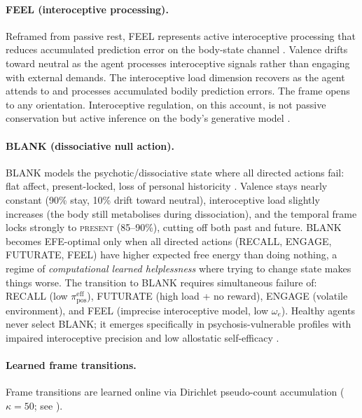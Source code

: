 \documentclass[11pt,a4paper]{article}
\begin{document}
\paragraph{FEEL (interoceptive processing).}
Reframed from passive rest, FEEL represents active interoceptive processing that reduces accumulated prediction error on the body-state channel \citep{sandvedsmith2021towards, stephan2016allostatic}. Valence drifts toward neutral as the agent processes interoceptive signals rather than engaging with external demands. The interoceptive load dimension recovers as the agent attends to and processes accumulated bodily prediction errors. The frame opens to any orientation. Interoceptive regulation, on this account, is not passive conservation but active inference on the body's generative model \citep{seth2016interoceptive, pezzulo2015active}.

\paragraph{BLANK (dissociative null action).}
BLANK models the psychotic/dissociative state where all directed actions fail: flat affect, present-locked, loss of personal historicity \citep{sterzer2018predictive}. Valence stays nearly constant (90\% stay, 10\% drift toward neutral), interoceptive load slightly increases (the body still metabolises during dissociation), and the temporal frame locks strongly to \textsc{present} (85--90\%), cutting off both past and future. BLANK becomes EFE-optimal only when all directed actions (RECALL, ENGAGE, FUTURATE, FEEL) have higher expected free energy than doing nothing, a regime of \emph{computational learned helplessness} where trying to change state makes things worse. The transition to BLANK requires simultaneous failure of: RECALL (low $\pi_{\text{pos}}^{\text{eff}}$), FUTURATE (high load + no reward), ENGAGE (volatile environment), and FEEL (imprecise interoceptive model, low $\omega_e$). Healthy agents never select BLANK; it emerges specifically in psychosis-vulnerable profiles with impaired interoceptive precision and low allostatic self-efficacy \citep{stephan2016allostatic, smith2020bayesian}.

\paragraph{Learned frame transitions.} Frame transitions are learned online via Dirichlet pseudo-count accumulation ($\kappa = 50$; see \citealt{albarracin2026temporal}).
\end{document}
